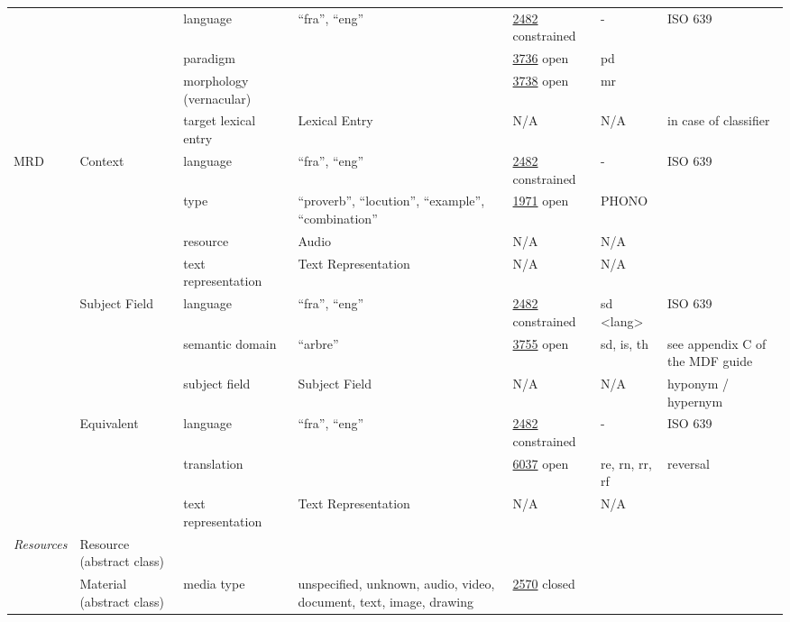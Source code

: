 \documentclass[a4paper,12pt]{article}
\begin{document}
\begin{center}
\begin{longtable}{*7{p{2cm}}}
& & language & ``fra'', ``eng'' & \href{http://www.isocat.org/datcat/DC-2482}{2482} constrained & - & ISO 639 \\ \cmidrule{3-7}
& & paradigm & & \href{http://www.isocat.org/datcat/DC-3736}{3736} open & pd & \\ \cmidrule{3-7}
& & morphology (vernacular) & & \href{http://www.isocat.org/datcat/DC-3738}{3738} open & mr & \\ \cmidrule{3-7}
& & target lexical entry & Lexical Entry & N/A & N/A & in case of classifier \\ \cmidrule{1-7}
\multirow{9}{2cm}{MRD} & \multirow{3}{2cm}{Context} & language & ``fra'', ``eng'' & \href{http://www.isocat.org/datcat/DC-2482}{2482} constrained & - & ISO 639 \\ \cmidrule{3-7}
& & type & ``proverb'', ``locution'', ``example'', ``combination'' & \href{http://www.isocat.org/datcat/DC-1971}{1971} open & PHONO & \\ \cmidrule{3-7}
& & resource & Audio & N/A & N/A & \\ \cmidrule{3-7}
& & text representation & Text Re\-pre\-sen\-ta\-tion & N/A & N/A & \\ \cmidrule{2-7}
& \multirow{3}{2cm}{Subject Field} & language & ``fra'', ``eng'' & \href{http://www.isocat.org/datcat/DC-2482}{2482} constrained & sd \textless lang\textgreater & ISO 639 \\ \cmidrule{3-7}
& & semantic domain & ``arbre'' & \href{http://www.isocat.org/datcat/DC-3755}{3755} open & sd, is, th & see appendix C of the MDF guide \\ \cmidrule{3-7}
& & subject field & Subject Field & N/A & N/A & hyponym / hypernym \\ \cmidrule{2-7}
& \multirow{3}{2cm}{Equivalent} & language & ``fra'', ``eng'' & \href{http://www.isocat.org/datcat/DC-2482}{2482} constrained & - & ISO 639 \\ \cmidrule{3-7}
& & translation & & \href{http://www.isocat.org/datcat/DC-6037}{6037} open & re, rn, rr, rf & reversal \\ \cmidrule{3-7}
& & text representation & Text Re\-pre\-sen\-ta\-tion & N/A & N/A & \\ \cmidrule{1-7}
\multirow{19}{2cm}{\textit{Resources}} & \multirow{1}{2cm}{Resource (abstract class)} & & & & & \\ \cmidrule{2-7}
& \multirow{2}{2cm}{Material (abstract class)} & media type & unspecified, unknown, audio, video, document, text, image, drawing & \href{http://www.isocat.org/datcat/DC-2570}{2570} closed & & \\ \cmidrule{3-7}

\end{longtable}
\end{center}
\end{document}
